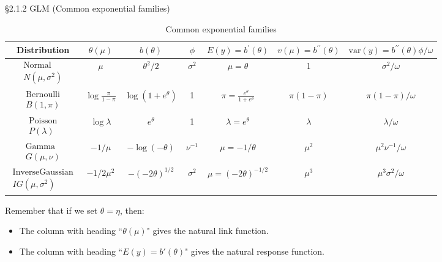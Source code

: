\documentclass{beamer}
\begin{document}
\begin{frame}{\S2.1.2 GLM (Common exponential families)}
\begin{table} [!htbp]
\caption{Common exponential families} \label{tab2.1}
\begin{center}
{\tiny
\begin{tabular}{|c|c|c|c|c|c|c|}
\hline
Distribution & $\theta (\mu)$ & $b(\theta)$ & $\phi$ & $E(y)=b^\prime(\theta)$ & $v(\mu)=b^{\prime\prime}(\theta)$
& $\mbox{var}(y)=b^{\prime\prime}(\theta)\phi/\omega$ \\ \hline
$\begin{array}{c} \mbox{Normal} \\ N(\mu,\sigma^2)\end{array}$ & $\mu$ & $\theta^2/2$ & $\sigma^2$ 
& $\mu=\theta$ & 1 & $\sigma^2/\omega$ \\
\hline
$\begin{array}{c} \mbox{Bernoulli} \\ B(1,\pi)\end{array}$ & $\log\frac{\pi}{1\!-\!\pi}$ 
& $\log (1\!+\!e^\theta)$ & 1 & $\pi=\frac{e^\theta}{1+e^\theta}$ &
$\pi(1-\pi)$ & $\pi(1-\pi)/\omega$ \\ \hline
$\begin{array}{c} \mbox{Poisson} \\ P(\lambda)\end{array}$ & $\log\lambda$ & $e^\theta$ 
& 1 & $\lambda=e^\theta$ & $\lambda$ & $\lambda/\omega$ \\
\hline
$\begin{array}{c} \mbox{Gamma} \\ G(\mu,\nu)\end{array}$ & $-1/\mu$ & $-\log(-\theta)$ & $\nu^{-1}$ 
& $\mu=-1/\theta$ & $\mu^2$ & $\mu^2\nu^{-1}/\omega$ \\ \hline
$\begin{array}{c} \mbox{InverseGaussian} \\ IG(\mu,\sigma^2)\end{array}$ & $-1/2\mu^2$ & $-(-2\theta)^{1/2}$
& $\sigma^2$ &  $\mu=(-2\theta)^{-1/2}$ & $\mu^3$ & $\mu^3\sigma^2/\omega$ \\ \hline
\end{tabular}}
\end{center}
\end{table}
Remember that if we set $\theta = \eta$, then:
\begin{itemize}
\item The column with heading ``$\theta(\mu)$" gives the natural link function.
\item  The column with heading ``$E(y) = b'(\theta)$"  gives the natural response function.
\end{itemize}
\end{frame}
\end{document}
